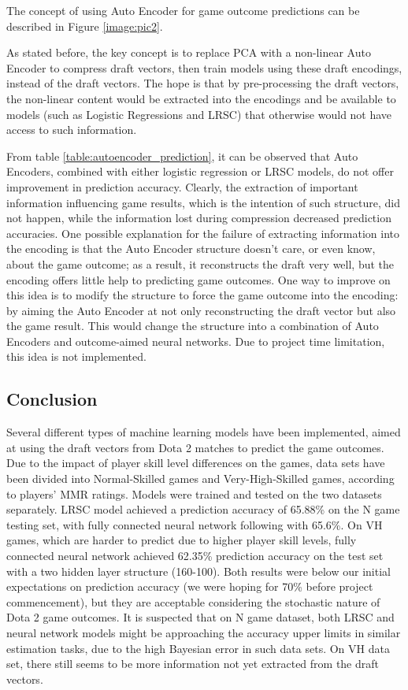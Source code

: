 \documentclass{article}
\begin{document}
The concept of using Auto Encoder for game outcome predictions can be described in Figure \ref{image:pic2}.

As stated before, the key concept is to replace PCA with a non-linear Auto Encoder to compress draft vectors, then train models using these draft encodings, instead of the draft vectors. The hope is that by pre-processing the draft vectors, the non-linear content would be extracted into the encodings and be available to models (such as Logistic Regressions and LRSC) that otherwise would not have access to such information.




From table \ref{table:autoencoder_prediction}, it can be observed that Auto Encoders, combined with either logistic regression or LRSC models, do not offer improvement in prediction accuracy. Clearly, the extraction of important information influencing game results, which is the intention of such structure, did not happen, while the information lost during compression decreased prediction accuracies. 
One possible explanation for the failure of extracting information into the encoding is that the Auto Encoder structure doesn’t care, or even know, about the game outcome; as a result, it reconstructs the draft very well, but the encoding offers little help to predicting game outcomes. One way to improve on this idea is to modify the structure to force the game outcome into the encoding: by aiming the Auto Encoder at not only reconstructing the draft vector but also the game result. This would change the structure into a combination of Auto Encoders and outcome-aimed neural networks. Due to project time limitation, this idea is not implemented.

\subsection{Conclusion}
Several different types of machine learning models have been implemented, aimed at using the draft vectors from Dota 2 matches to predict the game outcomes. Due to the impact of player skill level differences on the games, data sets have been divided into Normal-Skilled games and Very-High-Skilled games, according to players’ MMR ratings. Models were trained and tested on the two datasets separately.
LRSC model achieved a prediction accuracy of 65.88\% on the N game testing set, with fully connected neural network following with 65.6\%. On VH games, which are harder to predict due to higher player skill levels, fully connected neural network achieved 62.35\% prediction accuracy on the test set with a two hidden layer structure (160-100). Both results were below our initial expectations on prediction accuracy (we were hoping for 70\% before project commencement), but they are acceptable considering the stochastic nature of Dota 2 game outcomes.
It is suspected that on N game dataset, both LRSC and neural network models might be approaching the accuracy upper limits in similar estimation tasks, due to the high Bayesian error in such data sets. On VH data set, there still seems to be more information not yet extracted from the draft vectors.
\end{document}
